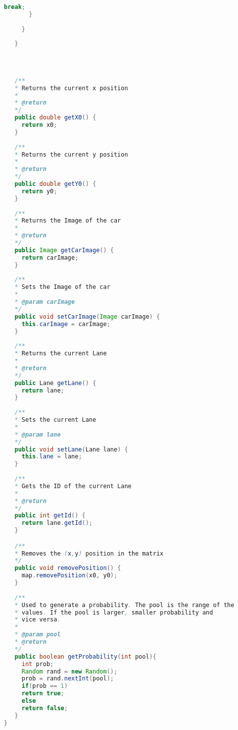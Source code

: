 \begin{lstlisting}[language=java]
         break;
       }
       
     }
     
   }
   
   
   
   
   /**
   * Returns the current x position
   * 
   * @return
   */
   public double getX0() {
     return x0;
   }
   
   /**
   * Returns the current y position
   * 
   * @return
   */
   public double getY0() {
     return y0;
   }
   
   /**
   * Returns the Image of the car
   * 
   * @return
   */
   public Image getCarImage() {
     return carImage;
   }
   
   /**
   * Sets the Image of the car
   * 
   * @param carImage
   */
   public void setCarImage(Image carImage) {
     this.carImage = carImage;
   }
   
   /**
   * Returns the current Lane
   * 
   * @return
   */
   public Lane getLane() {
     return lane;
   }
   
   /**
   * Sets the current Lane
   * 
   * @param lane
   */
   public void setLane(Lane lane) {
     this.lane = lane;
   }
   
   /**
   * Gets the ID of the current Lane
   * 
   * @return
   */
   public int getId() {
     return lane.getId();
   }

   /**
   * Removes the (x,y) position in the matrix
   */
   public void removePosition() {
     map.removePosition(x0, y0);
   }
   
   /**
   * Used to generate a probability. The pool is the range of the 
   * values. If the pool is larger, smaller probability and 
   * vice versa. 
   * 
   * @param pool
   * @return
   */
   public boolean getProbability(int pool){
     int prob; 
     Random rand = new Random(); 
     prob = rand.nextInt(pool); 
     if(prob == 1)
     return true; 
     else 
     return false;  
   }  
}

\end{lstlisting}
\newpage


